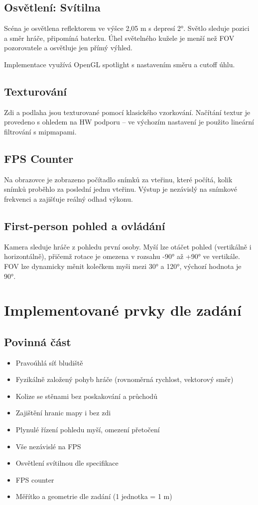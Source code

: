 \documentclass[12pt,a4paper]{article}
\begin{document}
\newpage
\subsection*{Osvětlení: Svítilna}
Scéna je osvětlena reflektorem ve výšce 2{,}05 m s depresí 2°. Světlo sleduje pozici a směr hráče, připomíná baterku. Úhel světelného kužele je menší než FOV pozorovatele a osvětluje jen přímý výhled.

Implementace využívá OpenGL spotlight s nastavením směru a cutoff úhlu.

\subsection*{Texturování}
Zdi a podlaha jsou texturované pomocí klasického vzorkování. Načítání textur je provedeno s ohledem na HW podporu – ve výchozím nastavení je použito lineární filtrování s mipmapami.

\subsection*{FPS Counter}
Na obrazovce je zobrazeno počítadlo snímků za vteřinu, které počítá, kolik snímků proběhlo za poslední jednu vteřinu. Výstup je nezávislý na snímkové frekvenci a zajišťuje reálný odhad výkonu.

\subsection*{First-person pohled a ovládání}
Kamera sleduje hráče z pohledu první osoby. Myší lze otáčet pohled (vertikálně i horizontálně), přičemž rotace je omezena v rozsahu -90° až +90° ve vertikále. FOV lze dynamicky měnit kolečkem myši mezi 30° a 120°, výchozí hodnota je 90°.

\section{Implementované prvky dle zadání}

\subsection*{Povinná část}
\begin{itemize}
    \item Pravoúhlá síť bludiště
    \item Fyzikálně založený pohyb hráče (rovnoměrná rychlost, vektorový směr)
    \item Kolize se stěnami bez poskakování a průchodů
    \item Zajištění hranic mapy i bez zdi
    \item Plynulé řízení pohledu myší, omezení přetočení
    \item Vše nezávislé na FPS
    \item Osvětlení svítilnou dle specifikace
    \item FPS counter
    \item Měřítko a geometrie dle zadání (1 jednotka = 1 m)
\end{itemize}
\end{document}
